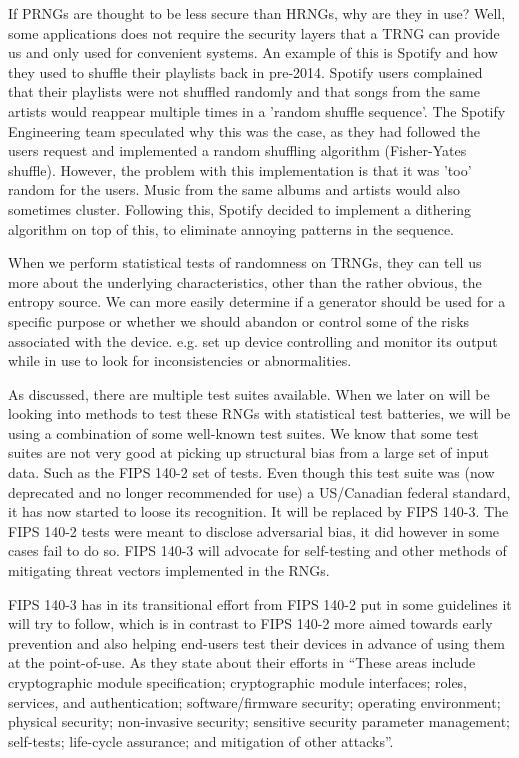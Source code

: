 \documentclass[]{final_report}
\begin{document}
\par{If PRNGs are thought to be less secure than HRNGs, why are they in use? Well, some applications does not require the security layers that a TRNG can provide us and only used for convenient systems. An example of this is Spotify and how they used to shuffle their playlists back in pre-2014\cite{Polacek:2014}. Spotify users complained that their playlists were not shuffled randomly and that songs from the same artists would reappear multiple times in a 'random shuffle sequence'. The Spotify Engineering team speculated why this was the case, as they had followed the users request and implemented a random shuffling algorithm (Fisher-Yates shuffle\cite{Toutenburg:1971}). However, the problem with this implementation is that it was 'too' random for the users. Music from the same albums and artists would also sometimes cluster. Following this, Spotify decided to implement a dithering algorithm on top of this, to eliminate annoying patterns in the sequence\cite{Polacek:2014}.}

\par{When we perform statistical tests of randomness on TRNGs, they can tell us more about the underlying characteristics, other than the rather obvious, the entropy source. We can more easily determine if a generator should be used for a specific purpose or whether we should abandon or control some of the risks associated with the device. e.g. set up device controlling and monitor its output while in use to look for inconsistencies or abnormalities.}

\par{As discussed, there are multiple test suites available. When we later on will be looking into methods to test these RNGs with statistical test batteries, we will be using a combination of some well-known test suites. We know that some test suites are not very good at picking up structural bias from a large set of input data. Such as the FIPS 140-2 set of tests\cite{NIST:2019}. Even though this test suite was (now deprecated and no longer recommended for use) a US/Canadian federal standard, it has now started to loose its recognition. It will be replaced by FIPS 140-3\cite{NIST:2019}. The FIPS 140-2 tests were meant to disclose adversarial bias, it did however in some cases fail to do so. FIPS 140-3 will advocate for self-testing and other methods of mitigating threat vectors implemented in the RNGs. } 

\par{FIPS 140-3 has in its transitional effort from FIPS 140-2 put in some guidelines it will try to follow, which is in contrast to FIPS 140-2 more aimed towards early prevention and also helping end-users test their devices in advance of using them at the point-of-use. As they state about their efforts in \cite{NIST2:2019}``These areas include cryptographic module specification; cryptographic module interfaces; roles, services, and authentication; software/firmware security; operating environment; physical security; non-invasive security; sensitive security parameter management; self-tests; life-cycle assurance; and mitigation of other attacks''.}
\end{document}

